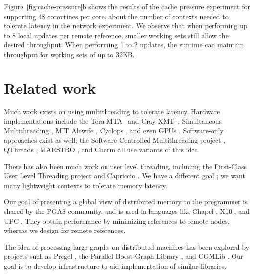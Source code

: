 \documentclass[10pt,nocopyrightspace,preprint]{sigplanconf}
\newcommand{\mrps}[1]{\unit[#1]{Mref/s}}
\begin{document}
Figure~\ref{fig:cache-pressure}b shows the results of the cache pressure experiment for supporting 48 coroutines per core, about the number of contexts needed to tolerate latency in the network experiment. We observe that when performing up to 8 local updates per remote reference, smaller working sets still allow the desired throughput. When performing 1 to 2 updates, the runtime can maintain throughput for working sets of up to 32KB.



\section{Related work}
\label{sec:related}


Much work exists on using multithreading to tolerate latency. Hardware
implementations include the Tera MTA~\cite{tera} and Cray
XMT~\cite{feo-xmt}, Simultaneous Multithreading \cite{tullsen-smt},
MIT Alewife \cite{agarwal-alewife}, Cyclops \cite{almasi-cyclops}, and
even GPUs \cite{gpus}. Software-only approaches exist as well; the
Software Controlled Multithreading project \cite{mowry-scm}, QThreads
\cite{qthreads}, MAESTRO \cite{maestro}, and Charm \cite{charm} all
use variants of this idea.

There has also been much work on user level threading, including the First-Class
User Level Threading project \cite{ult} and Capriccio \cite{capriccio}. We have a
different goal ; we want many lightweight contexts to tolerate memory
latency.

Our goal of presenting a global view of distributed memory to the
programmer is shared by the PGAS community, and is used in languages
like Chapel \cite{chapel}, X10 \cite{X10}, and UPC \cite{upc}. They
obtain performance by minimizing references to remote nodes, whereas we
design for remote references.

The idea of processing large graphs on distributed machines has been
explored by projects such as Pregel \cite{pregel}, the Parallel Boost
Graph Library \cite{parallelbgl}, and CGMLib \cite{cgmlib}. Our goal
is to develop infrastructure to aid implementation of similar
libraries.
\end{document}
